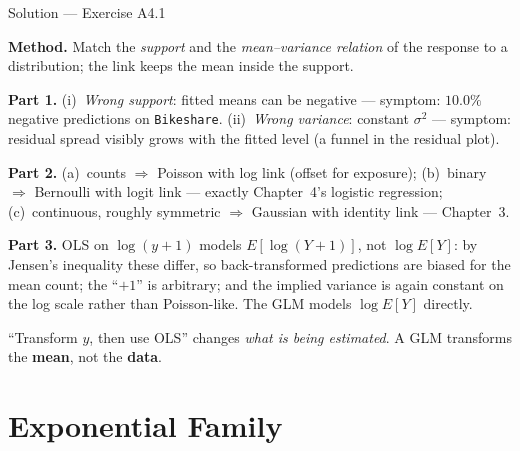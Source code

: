 \documentclass[aspectratio=169,11pt]{beamer}
\begin{document}
\begin{frame}{Solution --- Exercise A4.1}
\begin{solutionbox}
  \textbf{Method.} Match the \emph{support} and the \emph{mean--variance relation} of the
  response to a distribution; the link keeps the mean inside the support.

  \textbf{Part 1.} (i)~\emph{Wrong support}: fitted means can be negative ---
  symptom: $10.0\%$ negative predictions on \texttt{Bikeshare}. (ii)~\emph{Wrong
  variance}: constant $\sigma^2$ --- symptom: residual spread visibly grows with the
  fitted level (a funnel in the residual plot).

  \textbf{Part 2.} (a)~counts $\Rightarrow$ Poisson with log link (offset for exposure);
  (b)~binary $\Rightarrow$ Bernoulli with logit link --- exactly Chapter~4's logistic
  regression; (c)~continuous, roughly symmetric $\Rightarrow$ Gaussian with identity
  link --- Chapter~3.

  \textbf{Part 3.} OLS on $\log(y+1)$ models $E[\log(Y+1)]$, not $\log E[Y]$: by
  Jensen's inequality these differ, so back-transformed predictions are biased for the
  mean count; the ``$+1$'' is arbitrary; and the implied variance is again constant on
  the log scale rather than Poisson-like. The GLM models $\log E[Y]$ directly.
\end{solutionbox}
\begin{mistake}
  ``Transform $y$, then use OLS'' changes \emph{what is being estimated}. A GLM
  transforms the \textbf{mean}, not the \textbf{data}.
\end{mistake}
\end{frame}

\section{Exponential Family}
\end{document}
